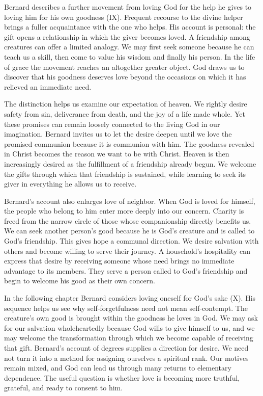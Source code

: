 Bernard describes a further movement from loving God for the help he gives to loving him for his own goodness (IX). Frequent recourse to the divine helper brings a fuller acquaintance with the one who helps. His account is personal: the gift opens a relationship in which the giver becomes loved. A friendship among creatures can offer a limited analogy. We may first seek someone because he can teach us a skill, then come to value his wisdom and finally his person. In the life of grace the movement reaches an altogether greater object. God draws us to discover that his goodness deserves love beyond the occasions on which it has relieved an immediate need.

The distinction helps us examine our expectation of heaven. We rightly desire safety from sin, deliverance from death, and the joy of a life made whole. Yet these promises can remain loosely connected to the living God in our imagination. Bernard invites us to let the desire deepen until we love the promised communion because it is communion with him. The goodness revealed in Christ becomes the reason we want to be with Christ. Heaven is then increasingly desired as the fulfillment of a friendship already begun. We welcome the gifts through which that friendship is sustained, while learning to seek its giver in everything he allows us to receive.

Bernard's account also enlarges love of neighbor. When God is loved for himself, the people who belong to him enter more deeply into our concern. Charity is freed from the narrow circle of those whose companionship directly benefits us. We can seek another person's good because he is God's creature and is called to God's friendship. This gives hope a communal direction. We desire salvation with others and become willing to serve their journey. A household's hospitality can express that desire by receiving someone whose need brings no immediate advantage to its members. They serve a person called to God's friendship and begin to welcome his good as their own concern.

In the following chapter Bernard considers loving oneself for God's sake (X). His sequence helps us see why self-forgetfulness need not mean self-contempt. The creature's own good is brought within the goodness he loves in God. We may ask for our salvation wholeheartedly because God wills to give himself to us, and we may welcome the transformation through which we become capable of receiving that gift. Bernard's account of degrees supplies a direction for desire. We need not turn it into a method for assigning ourselves a spiritual rank. Our motives remain mixed, and God can lead us through many returns to elementary dependence. The useful question is whether love is becoming more truthful, grateful, and ready to consent to him.

